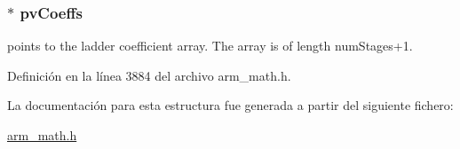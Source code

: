 \subsubsection[{\texorpdfstring{pv\+Coeffs}{pvCoeffs}}]{$\ast$ pv\+Coeffs}\hypertarget{structarm__iir__lattice__instance__f32_a0f8815744fade9c580d44277ff802308}{}\label{structarm__iir__lattice__instance__f32_a0f8815744fade9c580d44277ff802308}
points to the ladder coefficient array. The array is of length num\+Stages+1. 

Definición en la línea 3884 del archivo arm\+\_\+math.\+h.



La documentación para esta estructura fue generada a partir del siguiente fichero\+:\begin{DoxyCompactItemize}
\item 
\hyperlink{arm__math_8h}{arm\+\_\+math.\+h}\end{DoxyCompactItemize}
